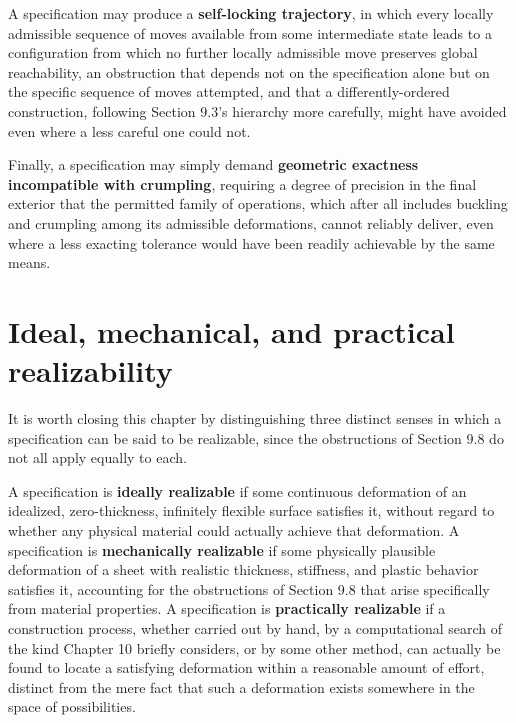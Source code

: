\documentclass[11pt,oneside]{book}
\begin{document}
A specification may produce a \textbf{self-locking trajectory}, in which
every locally admissible sequence of moves available from some
intermediate state leads to a configuration from which no further
locally admissible move preserves global reachability, an obstruction
that depends not on the specification alone but on the specific sequence
of moves attempted, and that a differently-ordered construction,
following Section 9.3's hierarchy more carefully, might have avoided
even where a less careful one could not.

Finally, a specification may simply demand \textbf{geometric exactness
incompatible with crumpling}, requiring a degree of precision in the
final exterior that the permitted family of operations, which after all
includes buckling and crumpling among its admissible deformations,
cannot reliably deliver, even where a less exacting tolerance would have
been readily achievable by the same means.

\hypertarget{ideal-mechanical-and-practical-realizability}{%
\section{Ideal, mechanical, and practical
realizability}\label{ideal-mechanical-and-practical-realizability}}

It is worth closing this chapter by distinguishing three distinct senses
in which a specification can be said to be realizable, since the
obstructions of Section 9.8 do not all apply equally to each.

A specification is \textbf{ideally realizable} if some continuous
deformation of an idealized, zero-thickness, infinitely flexible surface
satisfies it, without regard to whether any physical material could
actually achieve that deformation. A specification is
\textbf{mechanically realizable} if some physically plausible
deformation of a sheet with realistic thickness, stiffness, and plastic
behavior satisfies it, accounting for the obstructions of Section 9.8
that arise specifically from material properties. A specification is
\textbf{practically realizable} if a construction process, whether
carried out by hand, by a computational search of the kind Chapter 10
briefly considers, or by some other method, can actually be found to
locate a satisfying deformation within a reasonable amount of effort,
distinct from the mere fact that such a deformation exists somewhere in
the space of possibilities.
\end{document}
